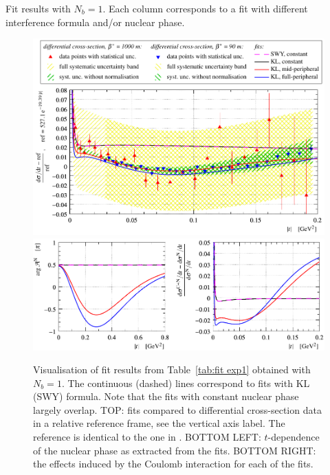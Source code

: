 \begin{table}
\caption{Fit results with $N_b=1$. Each column corresponds to a fit with different interference formula and/or nuclear phase. }
\vskip-3mm
\label{tab:fit exp1}
\begin{center}
\setlength\tabcolsep{2.5mm}
\small

\end{center}
\end{table}

\begin{figure}
\begin{center}
\includegraphics{fig/fit_exp1/t_dist_rel_with_fit.pdf}
\includegraphics{fig/fit_exp1/phase_cni_effect.pdf}
\caption{Visualisation of fit results from Table~\ref{tab:fit exp1} obtained with $N_b=1$. The continuous (dashed) lines correspond to fits with KL (SWY) formula. Note that the fits with constant nuclear phase largely overlap.
TOP: fits compared to differential cross-section data in a relative reference frame, see the vertical axis label. The reference is identical to the one in \cite{8tev-90m}. 
BOTTOM LEFT: $t$-dependence of the nuclear phase as extracted from the fits.
BOTTOM RIGHT: the effects induced by the Coulomb interaction for each of the fits.
}%
\label{fig:fit exp1}
\end{center}
\end{figure}

